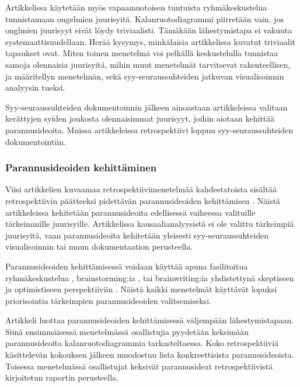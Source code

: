 Artikkelissa \citep{card1998learning} käytetään myös vapaamuotoisen tuntuista ryhmäkeskustelua tunnistamaan ongelmien juurisyitä. Kalanruotodiagrammi piirretään vain, jos onglmien juurisyyt eivät löydy triviaalisti. Tämäkään lähestymistapa ei vakuuta systemaattisuudellaan. Herää kysymys, minkälaisia artikkelissa kuvatut triviaalit tapaukset ovat. Miten toinen menetelmä voi pelkällä keskustelulla tunnistaa samoja olennaisia juurisyitä, mihin muut menetelmät tarvitsevat rakenteellisen, ja määritellyn menetelmän, sekä syy-seuraussuhteiden jatkuvan visualisoinnin analyysin tueksi.

Syy-seuraussuhteiden dokumentoinnin jälkeen ainoastaan artikkeleissa \citep{card1998learning, staalhane2004root, karlsson2006case, Lehtinen2011} valitaan kerättyjen syiden joukosta olennaisimmat juurisyyt, joihin aiotaan kehittää parannusideoita. Muissa artikkeleissa retrospektiivi loppuu syy-seuraussuhteiden dokumentointiin.

\subsubsection{Parannusideoiden kehittäminen}

Viisi artikkelien kuvaamaa retrospektiivimenetelmää kahdestatoista sisältää retrospektiivin päätteeksi pidettävän parannusideoiden kehittämisen \citep{card1998learning, staalhane2003post, staalhane2004root, karlsson2006case, Lehtinen2011}. Näistä artikkeleissa \citep{card1998learning, staalhane2004root, karlsson2006case, Lehtinen2011} kehitetään parannusideoita edellisessä vaiheessa valituille tärkeimmille juurisyille. Artikkelissa \citep{staalhane2003post} kausaalianalyysistä ei ole valittu tärkeimpiä juurisyitä, vaan parannusideoita kehitetään yleisesti syy-seuraussuhteiden visualisoinnin tai muun dokumentaation perusteella.

Parannusideoiden kehittämisessä voidaan käyttää apuna fasilitoitua ryhmäkeskustelua \citep{card1998learning, karlsson2006case}, brainstorming:ia \citep{staalhane2004root}, tai brainwriting:ia yhdistettynä skeptiseen ja optimistiseen perspektiiviin \citep{Lehtinen2011}. Näistä kaikki menetelmät käyttävät lopuksi priorisointia tärkeimpien parannusideoiden valitsemiseksi. 

Artikkeli \citep{staalhane2003post} luottaa parannusideoiden kehittämisessä väljempään lähestymistapaan. Siinä ensimmäisessä menetelmässä osallistujia pyydetään keksimään parannusideoita kalanruotodiagrammia tarkasteltaessa. Koko retrospektiiviä käsittelevän kokouksen jälkeen muodostuu lista konkreettisista parannusideoista. Toisessa menetelmässä osallistujat keksivät parannusideat retrospektiivistä kirjoitetun raportin perusteella. \citep{staalhane2003post}

